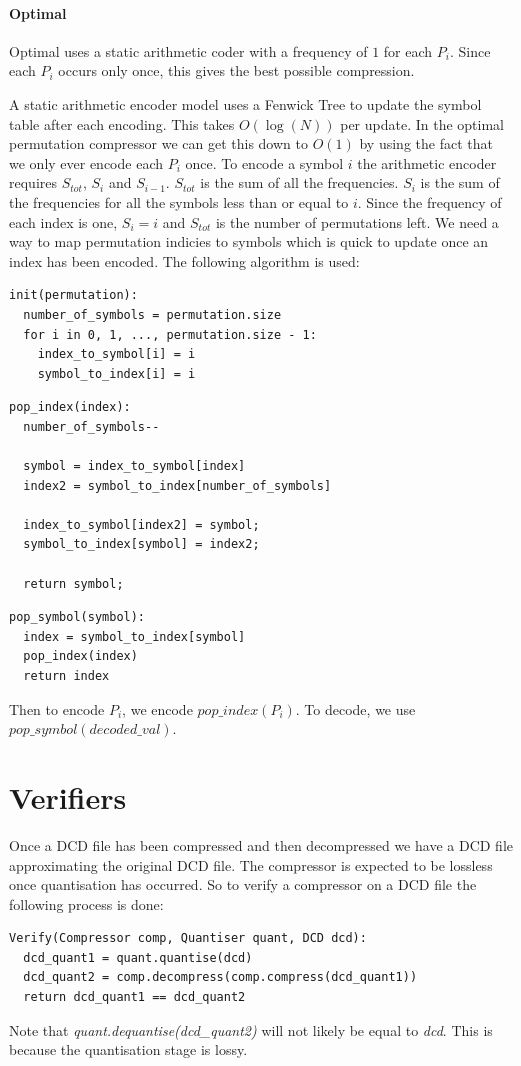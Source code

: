 \documentclass{report}
\begin{document}
\paragraph{Optimal}
Optimal uses a static arithmetic coder with a frequency of $1$ for each
$P_i$. Since each $P_i$ occurs only once, this gives the best possible
compression.

A static arithmetic encoder model uses a Fenwick Tree to update the symbol
table after each encoding. This takes $O(\log(N))$ per update. In the optimal
permutation compressor we can get this down to $O(1)$ by using the fact that
we only ever encode each $P_i$ once. To encode a symbol $i$ the arithmetic
encoder requires $S_{tot}$, $S_i$ and $S_{i-1}$. $S_{tot}$ is the sum of all
the frequencies. $S_i$ is the sum of the frequencies for all the symbols less
than or equal to $i$. Since the frequency of each index is one, $S_i = i$ and
$S_{tot}$ is the number of permutations left. We need a way to map permutation
indicies to symbols which is quick to update once an index has been
encoded. The following algorithm is used:

\begin{verbatim}
init(permutation):
  number_of_symbols = permutation.size
  for i in 0, 1, ..., permutation.size - 1:
    index_to_symbol[i] = i
    symbol_to_index[i] = i
\end{verbatim}

\begin{verbatim}
pop_index(index):
  number_of_symbols--

  symbol = index_to_symbol[index]
  index2 = symbol_to_index[number_of_symbols]

  index_to_symbol[index2] = symbol;
  symbol_to_index[symbol] = index2;

  return symbol;
\end{verbatim}

\begin{verbatim}
pop_symbol(symbol):
  index = symbol_to_index[symbol]
  pop_index(index)
  return index
\end{verbatim}

Then to encode $P_i$, we encode $pop\_index(P_i)$. To decode, we use
$pop\_symbol(decoded\_val)$.

\section{Verifiers}

Once a DCD file has been compressed and then decompressed we have a DCD file
approximating the original DCD file. The compressor is expected to be lossless
once quantisation has occurred. So to verify a compressor on a DCD file the
following process is done:

\begin{verbatim}
Verify(Compressor comp, Quantiser quant, DCD dcd):
  dcd_quant1 = quant.quantise(dcd)
  dcd_quant2 = comp.decompress(comp.compress(dcd_quant1))
  return dcd_quant1 == dcd_quant2
\end{verbatim}

Note that \emph{quant.dequantise(dcd\_quant2)} will not likely be equal to
\emph{dcd}. This is because the quantisation stage is lossy.

\nocite{*}

\end{document}

